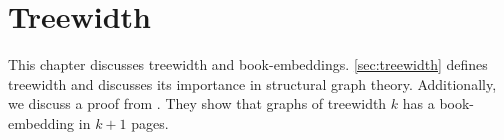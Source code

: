 \chapter{Treewidth}\label{chap:treewidth}
This chapter discusses treewidth and book-embeddings. \cref{sec:treewidth} defines treewidth and discusses its importance in structural graph theory. Additionally, we discuss a proof from \textcite{ganleyPagenumberTrees2001}. They show that graphs of treewidth $k$ has a book-embedding in $k + 1$ pages. 





